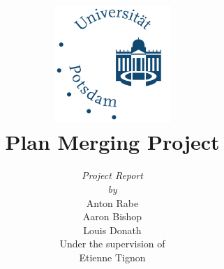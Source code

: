 \documentclass{llncs}
\begin{document}
\begin{titlepage}
\title{
\includegraphics[width=1.75in]{images/UP_Logo.png} \\
\vspace{20pt}
\textbf{\huge Plan Merging Project}\\
}

\author{
\textit{\Large Project Report}\\
\vspace{20pt}
\textit{\large by}\\
\vspace{10pt}
\Large Anton Rabe\\
Aaron Bishop\\
Louis Donath\\
\vspace{20pt}
Under the supervision of\\
Etienne Tignon
\vspace{3cm}
}

\end{titlepage}

\let\oldaddcontentsline\addcontentsline
\def\addcontentsline#1#2#3{}
\maketitle
\def\addcontentsline#1#2#3{\oldaddcontentsline{#1}{#2}{#3}}
\end{document}

